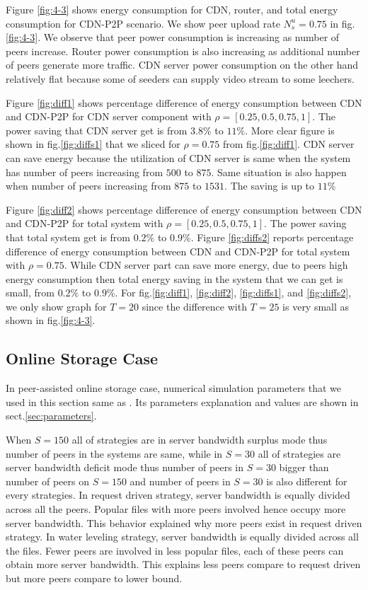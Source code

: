 \documentclass[conference]{IEEEtran}
\begin{document}
Figure \ref{fig:4-3} shows energy consumption for CDN, router, and total energy consumption for CDN-P2P scenario.
We show peer upload rate $N_{s}^{u}=0.75$ in fig.\ref{fig:4-3}.
We observe that peer power consumption is increasing as number of peers increase.  
Router power consumption is also increasing as additional number of peers generate more traffic. 
CDN server power consumption on the other hand relatively flat because some of seeders can supply video stream to some leechers.


Figure \ref{fig:diff1} shows percentage difference of energy consumption between CDN and CDN-P2P for CDN server component with $\rho=[0.25,0.5,0.75,1]$.
The power saving that CDN server get is from $3.8\%$ to $11\%$.
More clear figure is shown in fig.\ref{fig:diffs1} that we sliced for $\rho=0.75$ from fig.\ref{fig:diff1}. 
CDN server can save energy because the utilization of CDN server is same when the system has number of peers increasing from $500$ to $875$.
Same situation is also happen when number of peers increasing from $875$ to $1531$.  
The saving is up to $11\%$ 

Figure \ref{fig:diff2} shows percentage difference of energy consumption between CDN and CDN-P2P for total system with $\rho=[0.25,0.5,0.75,1]$.
The power saving that total system get is from $0.2\%$ to $0.9\%$.
Figure \ref{fig:diffs2} reports percentage difference of energy consumption between CDN and CDN-P2P for total system with $\rho=0.75$.
While CDN server part can save more energy, due to peers high energy consumption then total energy saving in the system that we can get is small, from $0.2\%$ to $0.9\%$.
For fig.\ref{fig:diff1}, \ref{fig:diff2}, \ref{fig:diffs1}, and \ref{fig:diffs2}, we only show graph for $T=20$ since the difference with $T=25$ is very small as shown in fig.\ref{fig:4-3}.


\subsection{Online Storage Case}\label{subsec:onlinestorage}

In peer-assisted online storage case, numerical simulation parameters that we used in this section same as \cite{Sun:2009:POS:1542245.1542249}.
Its parameters explanation and values are shown in sect.\ref{sec:parameters}.

When $S=150$ all of strategies are in server bandwidth surplus mode thus number of peers in the systems are same, while in $S=30$ all of strategies are server bandwidth deficit mode thus number of peers in $S=30$ bigger than number of peers on $S=150$ and number of peers in $S=30$ is also different for every strategies. 
In request driven strategy, server bandwidth is equally divided across all the peers. 
Popular files with more peers involved hence occupy more server bandwidth. 
This behavior explained why more peers exist in request driven strategy.
In water leveling strategy, server bandwidth is equally divided across all the files.  
Fewer peers are involved in less popular files, each of these peers can obtain more server bandwidth.  
This explains less peers compare to request driven but more peers compare to lower bound.
\end{document}
